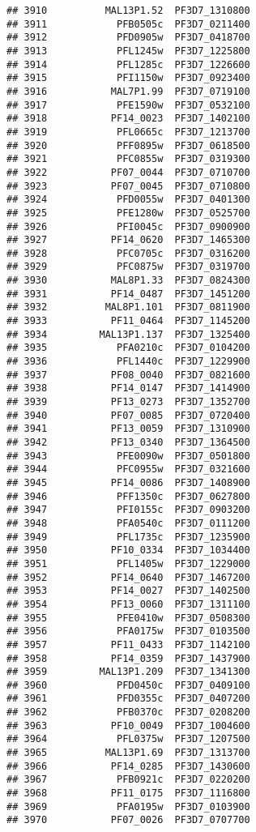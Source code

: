 \documentclass{article}\usepackage[]{graphicx}\usepackage[]{color}
\makeatletter
\newenvironment{kframe}{%
 \def\at@end@of@kframe{}%
 \ifinner\ifhmode%
  \def\at@end@of@kframe{\end{minipage}}%
  \begin{minipage}{\columnwidth}%
 \fi\fi%
 \def\FrameCommand##1{\hskip\@totalleftmargin \hskip-\fboxsep
 \colorbox{shadecolor}{##1}\hskip-\fboxsep
     \hskip-\linewidth \hskip-\@totalleftmargin \hskip\columnwidth}%
 \MakeFramed {\advance\hsize-\width
   \@totalleftmargin\z@ \linewidth\hsize
   \@setminipage}}%
 {\par\unskip\endMakeFramed%
 \at@end@of@kframe}
\newenvironment{knitrout}{}{} %
\makeatother
\begin{document}
\begin{knitrout}
\begin{kframe}
\begin{verbatim}
## 3910          MAL13P1.52  PF3D7_1310800
## 3911            PFB0505c  PF3D7_0211400
## 3912            PFD0905w  PF3D7_0418700
## 3913            PFL1245w  PF3D7_1225800
## 3914            PFL1285c  PF3D7_1226600
## 3915            PFI1150w  PF3D7_0923400
## 3916           MAL7P1.99  PF3D7_0719100
## 3917            PFE1590w  PF3D7_0532100
## 3918           PF14_0023  PF3D7_1402100
## 3919            PFL0665c  PF3D7_1213700
## 3920            PFF0895w  PF3D7_0618500
## 3921            PFC0855w  PF3D7_0319300
## 3922           PF07_0044  PF3D7_0710700
## 3923           PF07_0045  PF3D7_0710800
## 3924            PFD0055w  PF3D7_0401300
## 3925            PFE1280w  PF3D7_0525700
## 3926            PFI0045c  PF3D7_0900900
## 3927           PF14_0620  PF3D7_1465300
## 3928            PFC0705c  PF3D7_0316200
## 3929            PFC0875w  PF3D7_0319700
## 3930           MAL8P1.33  PF3D7_0824300
## 3931           PF14_0487  PF3D7_1451200
## 3932          MAL8P1.101  PF3D7_0811900
## 3933           PF11_0464  PF3D7_1145200
## 3934         MAL13P1.137  PF3D7_1325400
## 3935            PFA0210c  PF3D7_0104200
## 3936            PFL1440c  PF3D7_1229900
## 3937           PF08_0040  PF3D7_0821600
## 3938           PF14_0147  PF3D7_1414900
## 3939           PF13_0273  PF3D7_1352700
## 3940           PF07_0085  PF3D7_0720400
## 3941           PF13_0059  PF3D7_1310900
## 3942           PF13_0340  PF3D7_1364500
## 3943            PFE0090w  PF3D7_0501800
## 3944            PFC0955w  PF3D7_0321600
## 3945           PF14_0086  PF3D7_1408900
## 3946            PFF1350c  PF3D7_0627800
## 3947            PFI0155c  PF3D7_0903200
## 3948            PFA0540c  PF3D7_0111200
## 3949            PFL1735c  PF3D7_1235900
## 3950           PF10_0334  PF3D7_1034400
## 3951            PFL1405w  PF3D7_1229000
## 3952           PF14_0640  PF3D7_1467200
## 3953           PF14_0027  PF3D7_1402500
## 3954           PF13_0060  PF3D7_1311100
## 3955            PFE0410w  PF3D7_0508300
## 3956            PFA0175w  PF3D7_0103500
## 3957           PF11_0433  PF3D7_1142100
## 3958           PF14_0359  PF3D7_1437900
## 3959         MAL13P1.209  PF3D7_1341300
## 3960            PFD0450c  PF3D7_0409100
## 3961            PFD0355c  PF3D7_0407200
## 3962            PFB0370c  PF3D7_0208200
## 3963           PF10_0049  PF3D7_1004600
## 3964            PFL0375w  PF3D7_1207500
## 3965          MAL13P1.69  PF3D7_1313700
## 3966           PF14_0285  PF3D7_1430600
## 3967            PFB0921c  PF3D7_0220200
## 3968           PF11_0175  PF3D7_1116800
## 3969            PFA0195w  PF3D7_0103900
## 3970           PF07_0026  PF3D7_0707700

\end{verbatim}
\end{kframe}
\end{knitrout}
\end{document}
